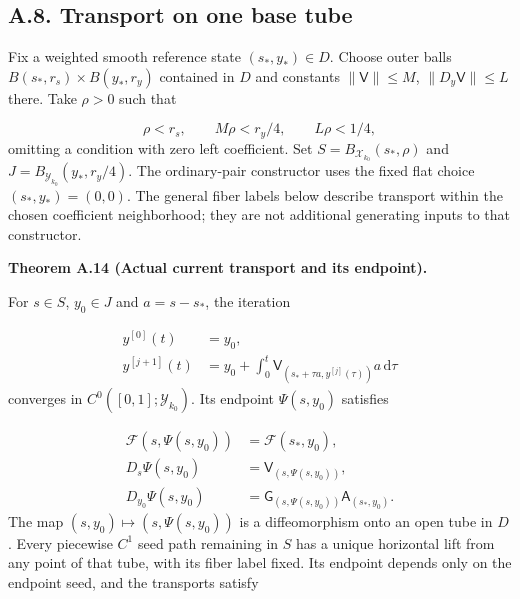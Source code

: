 \documentclass[
  english,
  11pt,
  reqno]{amsart}
\makeatletter
\newcommand{\pandocstatementheading}[1]{%
  \par\addpenalty{\@beginparpenalty}%
  \addvspace{.5\baselineskip plus .2\baselineskip minus .2\baselineskip}%
  {\normalfont\bfseries #1\par}%
  \nobreak\@afterindenttrue\@afterheading
}
\makeatother
\begin{document}
\subsection{A.8. Transport on one base
tube}\label{a.8.-transport-on-one-base-tube}\label{sec:online-current-flat-input-transport}

Fix a weighted smooth reference state \((s_*,y_*)\in D\). Choose outer
balls \(B(s_*,r_s)\times B(y_*,r_y)\) contained in \(D\) and constants
\(\|\mathsf V\|\le M\), \(\|D_y\mathsf V\|\le L\) there. Take \(\rho>0\)
such that

\label{eq:online-current-transport-base-radii} \[
\rho<r_s,\qquad M\rho<r_y/4,\qquad L\rho<1/4,
\] omitting a condition with zero left coefficient. Set
\(S=B_{\mathcal X_{k_0}}(s_*,\rho)\) and
\(J=B_{\mathcal Y_{k_0}}(y_*,r_y/4)\). The ordinary-pair constructor
uses the fixed flat choice \((s_*,y_*)=(0,0)\). The general fiber labels
below describe transport within the chosen coefficient neighborhood;
they are not additional generating inputs to that constructor.

\pandocstatementheading{\leavevmode{}\label{thm:online-current-input-transport}Theorem A.14 (Actual current transport and its endpoint).}

For \(s\in S\), \(y_0\in J\) and \(a=s-s_*\), the iteration

\label{eq:online-current-picard-iteration} \[
\begin{aligned}
y^{[0]}(t)&=y_0,\\
y^{[j+1]}(t)
&=y_0+\int_0^t
\mathsf V_{(s_*+\tau a,y^{[j]}(\tau))}a\,\mathrm d\tau
\end{aligned}
\] converges in \(C^0([0,1];\mathcal Y_{k_0})\). Its endpoint
\(\Psi(s,y_0)\) satisfies

\label{eq:online-current-endpoint-identities} \[
\begin{aligned}
\mathcal F(s,\Psi(s,y_0))&=\mathcal F(s_*,y_0),\\
D_s\Psi(s,y_0)&=\mathsf V_{(s,\Psi(s,y_0))},\\
D_{y_0}\Psi(s,y_0)&=
\mathsf G_{(s,\Psi(s,y_0))}\mathsf A_{(s_*,y_0)}.
\end{aligned}
\] The map \((s,y_0)\mapsto(s,\Psi(s,y_0))\) is a diffeomorphism onto an
open tube in \(D\). Every piecewise \(C^1\) seed path remaining in \(S\)
has a unique horizontal lift from any point of that tube, with its fiber
label fixed. Its endpoint depends only on the endpoint seed, and the
transports satisfy
\end{document}
